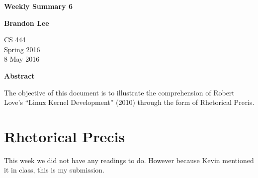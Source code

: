 \documentclass[letterpaper,10pt,titlepage]{article}
\begin{document}
\begin{titlepage}
    \begin{center}
        \vspace*{3.5cm}

        \textbf{Weekly Summary 6}

        \vspace{0.5cm}

        \textbf{Brandon Lee}

        \vspace{0.8cm}

        CS 444\\
        Spring 2016\\
        8 May 2016\\

        \vspace{1cm}

        \textbf{Abstract}\\

        \vspace{0.5cm}

        The objective of this document is to illustrate the comprehension of Robert Love's “Linux Kernel Development” (2010) through the form of Rhetorical Precis.


        \vfill



    \end{center}
\end{titlepage}

\newpage

\section{Rhetorical Precis}

This week we did not have any readings to do. However because Kevin mentioned it in class, this is my submission.
\end{document}
